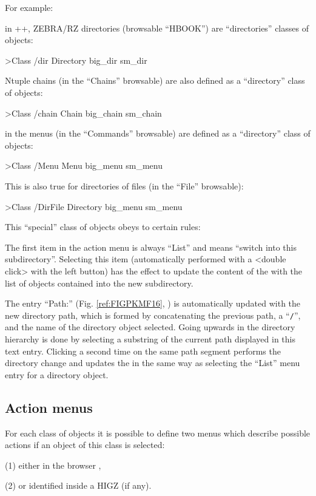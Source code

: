 For example:
\begin{UL}
\item
in \PAW++{}, ZEBRA/RZ directories (browsable ``HBOOK'') are ``directories''
classes of objects: 
\begin{XMPt} {}
       >Class /dir Directory big\_dir sm\_dir
\end{XMPt}
Ntuple chains (in the ``Chains'' browsable) are also defined as a ``directory'' 
class of objects:
\begin{XMPt} {}
       >Class /chain Chain big\_chain sm\_chain
\end{XMPt}
\item
in \KUIPMotif{} the menus (in the ``Commands'' browsable) are defined as 
a ``directory'' class of objects:
\begin{XMPt} {}
       >Class /Menu Menu big\_menu sm\_menu
\end{XMPt}
This is also true for directories of files (in the ``File'' browsable):
\begin{XMPt} {}
       >Class /DirFile Directory big\_menu sm\_menu
\end{XMPt}
\end{UL}

This ``special'' class of objects obeys to certain rules:
\begin{UL}
\item
The first item in the action menu is always ``List'' and means ``switch into 
this subdirectory''. Selecting this item (automatically performed with 
a <double click> with the left button) has the effect to update
the content of the \OW{} with the list of objects contained
into the new subdirectory.
\item
The entry ``Path:'' (Fig. \ref{ref:FIGPKMF16}, 
) is automatically updated
with the new directory path, which is formed by concatenating the previous
path, a ``{\tt /}'', and the name of the directory object selected.
Going upwards in the directory hierarchy is done by selecting a
substring of the current path displayed in this text entry. Clicking
a second time on the same path segment performs the directory change
and updates the \OW{} in the same way as selecting the ``List'' 
menu entry for a directory object.
\end{UL}

\subsection{Action menus}

For each class of objects it is possible to define two menus which describe 
possible actions if an object of this class is selected:
\begin{UL}
\item[(1)]
either in the browser \OW{},
\item[(2)]
or identified inside a HIGZ \GW{} (if any).
\end{UL}

